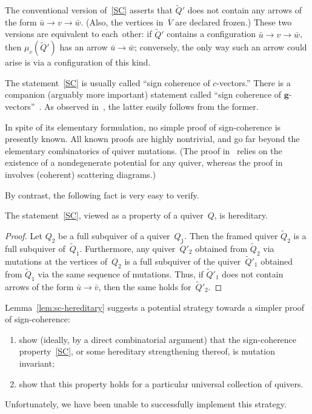 
\begin{remark}
The conventional version of~\ref{SC} asserts that $\widetilde Q'$ does not contain any 
arrows of the form $\bar u\to v\to \bar w$. 
(Also, the vertices in~$\overline V$ are declared frozen.) 
These two versions are equivalent to each~other: 
if $\widetilde Q'$ contains a configuration $\bar u\to v\to \bar w$,
then $\mu_v(\widetilde Q')$ has an arrow $\bar u\to \bar w$; conversely, 
the only way such an arrow could arise is via a configuration of this kind. 
\end{remark}

\begin{remark}
The statement~\ref{SC} is usually called ``sign coherence of $c$-vectors.''
There is a companion (arguably more important) statement called
``sign coherence of $\mathbf{g}$-vectors''~\cite{ca4}. 
As observed in~\cite{nakanishi-zelevinsky}, the latter easily follows from the former. 
\end{remark}

In spite of its elementary formulation, no simple proof of sign-coherence is presently known. 
All known proofs are highly nontrivial, 
and go far beyond the elementary combinatorics of quiver mutations. 
(The proof in~\cite{DWZ2} relies on the existence of a nondegenerate potential for any quiver,
whereas the proof in~\cite{GHKK} involves (coherent) scattering diagrams.) 

By contrast, the following fact is very easy to verify. 

\begin{lemma}
\label{lem:sc-hereditary}
The statement~\ref{SC}, viewed as a property of a quiver~$Q$, is hereditary. 
\end{lemma}

\begin{proof}
Let $Q_2$ be a full subquiver of a quiver~$Q_1$.
Then the framed quiver $\widetilde Q_2$ is a full subquiver of~$\widetilde Q_1$.
Furthermore, any quiver~$\widetilde Q'_2$ obtained from $\widetilde Q_2$ 
via mutations at the vertices of~$Q_2$
is a full subquiver of the quiver~$\widetilde Q'_1$ obtained from $\widetilde Q_1$ via the same sequence of mutations.
Thus, if $\widetilde Q'_1$ does not contain arrows of the form $\bar u\to \bar v$,
then the same holds for~$\widetilde Q'_2$. 
\end{proof}

$\!$Lemma~\ref{lem:sc-hereditary} suggests a potential strategy 
towards a simpler proof of sign-coherence:
\begin{enumerate}[label=(\alph*)]
\item\label{sect5_i} %
show (ideally, by a direct combinatorial argument) that the sign-coherence property~\ref{SC}, 
or some hereditary %
strengthening thereof, is mutation inva\-riant; 
\item\label{sect5_ii} %
show that this property holds for a particular universal collection of quivers. 
\end{enumerate}
Unfortunately, we have been unable to successfully implement this strategy. 

